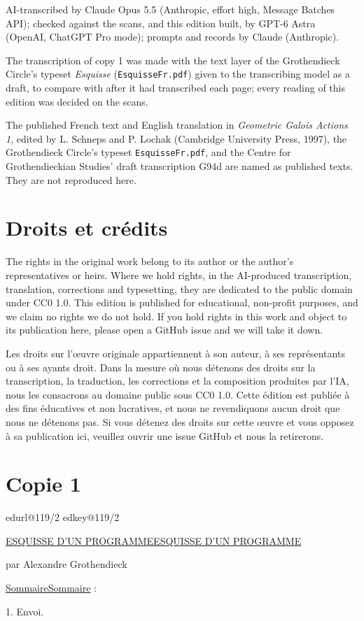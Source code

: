 \documentclass[11pt,a4paper]{article}
\makeatletter
\newif\ifreading
\def\CurrentScanURL{}
\def\CurrentPageKey{}
\def\CurrentCopy{copy1}
\def\CurrentApparatus{}
\newcommand{\EditionPart}[2]{\clearpage\def\CurrentCopy{#1}\section*{#2}}
\newcommand{\scanpage}[1]{%
  \clearpage
  \expandafter\let\expandafter\CurrentScanURL\csname edurl@#1\endcsname
  \expandafter\let\expandafter\CurrentPageKey\csname edkey@#1\endcsname
  \def\CurrentApparatus{}%
  \hypertarget{scan-\CurrentPageKey}{}%
  \typeout{EDITION-SCAN: \CurrentPageKey; PDFPAGE: \the\numexpr\ReadonlyShipoutCounter+1\relax}%
  \ifreading
    \marginnote{\raggedright\scriptsize\sffamily\href{\CurrentScanURL}{119 / \csname edpage@#1\endcsname}}%
  \else
    \noindent{\small\sffamily\href{\CurrentScanURL}{[scan #1]}}\par\smallskip
  \fi}
\let\TextUline\uline
\renewcommand{\uline}[1]{\ifmmode\underline{#1}\else\TextUline{#1}\fi}
\makeatother
\begin{document}
\smallskip
AI-transcribed by Claude Opus 5.5 (Anthropic, effort high, Message Batches API); checked against the scans, and this edition built, by GPT-6 Astra (OpenAI, ChatGPT Pro mode); prompts and records by Claude (Anthropic).


The transcription of copy 1 was made with the text layer of the Grothendieck Circle's typeset \textit{Esquisse} (\texttt{EsquisseFr.pdf}) given to the transcribing model as a draft, to compare with after it had transcribed each page; every reading of this edition was decided on the scans.

The published French text and English translation in \textit{Geometric Galois Actions 1}, edited by L. Schneps and P. Lochak (Cambridge University Press, 1997), the Grothendieck Circle's typeset \texttt{EsquisseFr.pdf}, and the Centre for Grothendieckian Studies' draft transcription G94d are named as published texts. They are not reproduced here.

\section*{Droits et crédits}
The rights in the original work belong to its author or the author's representatives or heirs. Where we hold rights, in the AI-produced transcription, translation, corrections and typesetting, they are dedicated to the public domain under CC0 1.0. This edition is published for educational, non-profit purposes, and we claim no rights we do not hold. If you hold rights in this work and object to its publication here, please open a GitHub issue and we will take it down.

Les droits sur l'œuvre originale appartiennent à son auteur, à ses représentants ou à ses ayants droit. Dans la mesure où nous détenons des droits sur la transcription, la traduction, les corrections et la composition produites par l'IA, nous les consacrons au domaine public sous CC0 1.0. Cette édition est publiée à des fins éducatives et non lucratives, et nous ne revendiquons aucun droit que nous ne détenons pas. Si vous détenez des droits sur cette œuvre et vous opposez à sa publication ici, veuillez ouvrir une issue GitHub et nous la retirerons.
\clearpage

\EditionPart{copy1}{Copie 1}
\scanpage{119/2}
\uline{ESQUISSE D'UN PROGRAMME}

par Alexandre Grothendieck

\uline{Sommaire} :

1. Envoi.
\end{document}
